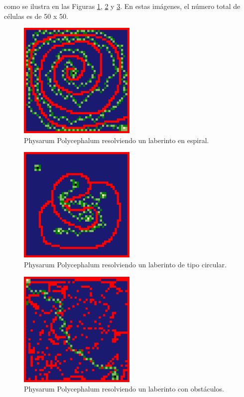         como se ilustra en las Figuras \ref{fig:physarumCircle1}, 
        \ref{fig:physarumRandom1} y \ref{fig:physarumObstacles1}. En estas im\'agenes, el n\'umero total de c\'elulas es de 50 x 50.
    \vskip 0.5cm
    \begin{figure}[htbp]
        \centerline{\includegraphics[width=0.5\textwidth]{./images/desarrollo/physarum/Circular1.png}}
        \caption{Physarum Polycephalum resolviendo un laberinto en espiral.} 
        \label{fig:physarumCircle1}    
    \end{figure}
    \begin{figure}[htbp]
        \centerline{\includegraphics[width=0.5\textwidth]{./images/desarrollo/physarum/Random1.png}}
        \caption{Physarum Polycephalum resolviendo un laberinto de tipo circular.}
        \label{fig:physarumRandom1}    
    \end{figure}
    \begin{figure}[htbp]
        \centerline{\includegraphics[width=0.5\textwidth]{./images/desarrollo/physarum/Obstaculos1.png}}
        \caption{Physarum Polycephalum resolviendo un laberinto con obst\'aculos.}
        \label{fig:physarumObstacles1}
    \end{figure}
